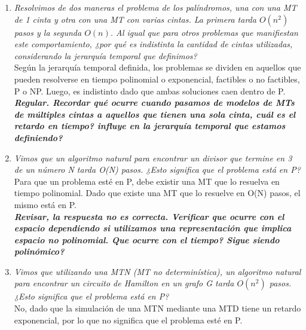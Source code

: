 \documentclass[lnbip]{svmultln}
\begin{document}
\begin{enumerate}
    \item \textit{Resolvimos de dos maneras el problema de los palíndromos, una con una MT de 1 cinta y otra con una MT con varias cintas. La primera tarda $O(n^{2})$ pasos y la segunda $O(n)$. Al igual que para otros problemas que manifiestan este comportamiento, ¿por qué es indistinta la cantidad de cintas utilizadas, considerando la jerarquía temporal que definimos?} \\
    
    Según la jerarquía temporal definida, los problemas se dividen en aquellos que pueden resolverse en tiempo polinomial o exponencial, factibles o no factibles, P o NP. Luego, es indistinto dado que ambas soluciones caen dentro de P. \\
    
    \textbf{\textit{Regular. Recordar qué ocurre cuando pasamos de modelos de MTs de múltiples cintas a aquellos que tienen una sola cinta, cuál es el retardo en tiempo? influye en la jerarquía temporal que estamos definiendo?}} \\
    
    \item \textit{Vimos que un algoritmo natural para encontrar un divisor que termine en 3 de un número N tarda O(N) pasos. ¿Esto significa que el problema está en P?} \\
    
    Para que un problema esté en P, debe existir una MT que lo resuelva en tiempo polinomial. Dado que existe una MT que lo resuelve en O(N) pasos, el mismo está en P. \\
    
    \textbf{\textit{Revisar, la respuesta no es correcta. Verificar que ocurre con el espacio dependiendo si utilizamos una representación que implica espacio no polinomial. Que ocurre con el tiempo? Sigue siendo polinómico?}} \\
    
    \item \textit{Vimos que utilizando una MTN (MT no determinística), un algoritmo natural para encontrar un circuito de Hamilton en un grafo G tarda $O(n^{2})$ pasos. ¿Esto significa que el problema está en P?} \\
    
    No, dado que la simulación de una MTN mediante una MTD tiene un retardo exponencial, por lo que no significa que el problema esté en P. \\
    

\end{enumerate}
\end{document}
